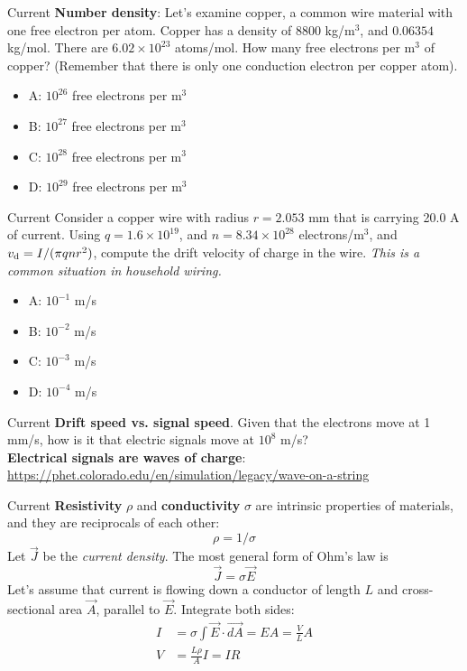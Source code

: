 \documentclass{beamer}
\begin{document}
\begin{frame}{Current}
\textbf{Number density}: Let's examine copper, a common wire material with one free electron per atom.  Copper has a density of 8800 kg/m$^3$, and $0.06354$ kg/mol.  There are $6.02 \times 10^{23}$ atoms/mol.  How many free electrons per m$^3$ of copper? (Remember that there is only one conduction electron per copper atom).
\begin{itemize}
\item A: $10^{26}$ free electrons per m$^3$
\item B: $10^{27}$ free electrons per m$^3$
\item C: $10^{28}$ free electrons per m$^3$
\item D: $10^{29}$ free electrons per m$^3$
\end{itemize}
\end{frame}

\begin{frame}{Current}
Consider a copper wire with radius $r = 2.053$ mm that is carrying 20.0 A of current.  Using $q = 1.6\times 10^{19}$, and $n = 8.34 \times 10^{28}$ electrons/m$^3$, and $v_{\rm d} = I/(\pi q n r^2)$, compute the drift velocity of charge in the wire.  \textit{This is a common situation in household wiring.}
\begin{itemize}
\item A: $10^{-1}$ m/s
\item B: $10^{-2}$ m/s
\item C: $10^{-3}$ m/s
\item D: $10^{-4}$ m/s
\end{itemize}
\end{frame}

\begin{frame}{Current}
\textbf{Drift speed vs. signal speed}.  Given that the electrons move at 1 mm/s, how is it that electric signals move at $10^8$ m/s? \\ \vspace{1cm}
\textbf{Electrical signals are \alert{waves} of charge}: \\ \url{https://phet.colorado.edu/en/simulation/legacy/wave-on-a-string}
\end{frame}

\begin{frame}{Current}
\textbf{Resistivity} $\rho$ and \textbf{conductivity} $\sigma$ are intrinsic properties of materials, and they are reciprocals of each other:
\begin{equation}
\rho = 1/\sigma
\end{equation}
Let $\vec{J}$ be the \textit{current density}.  The most general form of Ohm's law is
\begin{equation}
\boxed{
\vec{J} = \sigma \vec{E}}
\end{equation}
Let's assume that current is flowing down a conductor of length $L$ and cross-sectional area $\vec{A}$, parallel to $\vec{E}$.  Integrate both sides:
\begin{align}
I &= \sigma \int \vec{E} \cdot \vec{dA} = E A = \frac{V}{L} A \\
V &= \frac{L \rho}{A} I = I R
\end{align} 
\end{frame}
\end{document}
